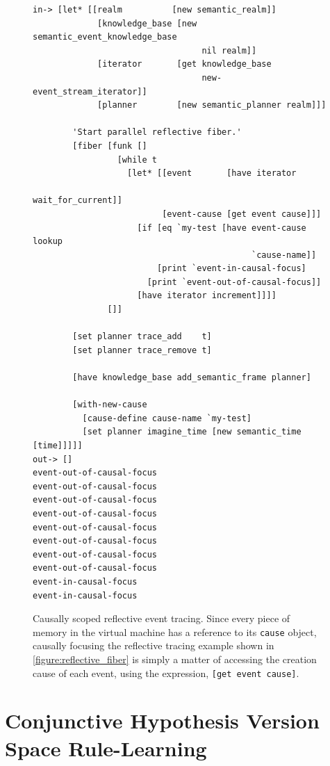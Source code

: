 \begin{figure}[h]
\centering
{\scriptsize
\begin{Verbatim}[frame=single]
 in-> [let* [[realm          [new semantic_realm]]
             [knowledge_base [new semantic_event_knowledge_base
                                  nil realm]]
             [iterator       [get knowledge_base
                                  new-event_stream_iterator]]
             [planner        [new semantic_planner realm]]]

        'Start parallel reflective fiber.'
        [fiber [funk []
                 [while t
                   [let* [[event       [have iterator
                                             wait_for_current]]
                          [event-cause [get event cause]]]
                     [if [eq `my-test [have event-cause lookup
                                            `cause-name]]
                         [print `event-in-causal-focus]
                       [print `event-out-of-causal-focus]]
                     [have iterator increment]]]]
               []]
        
        [set planner trace_add    t]
        [set planner trace_remove t]
        
        [have knowledge_base add_semantic_frame planner]
        
        [with-new-cause
          [cause-define cause-name `my-test]
          [set planner imagine_time [new semantic_time [time]]]]]
out-> []
event-out-of-causal-focus
event-out-of-causal-focus
event-out-of-causal-focus
event-out-of-causal-focus
event-out-of-causal-focus
event-out-of-causal-focus
event-out-of-causal-focus
event-out-of-causal-focus
event-in-causal-focus
event-in-causal-focus
\end{Verbatim}
}
\caption[Causally scoped reflective event tracing.]{Causally scoped
  reflective event tracing.  Since every piece of memory in the
  virtual machine has a reference to its {\tt{cause}} object, causally
  focusing the reflective tracing example shown in
  {\mbox{\autoref{figure:reflective_fiber}}} is simply a matter of
  accessing the creation cause of each event, using the expression,
  {\tt{[get event cause]}}.}
\label{figure:reflective_event_causal_tracing}
\end{figure}

\section{Conjunctive Hypothesis Version Space Rule-Learning}

